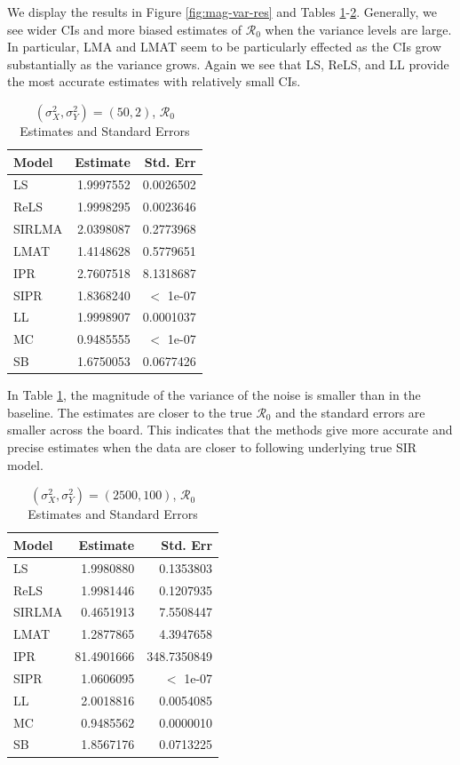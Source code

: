 \documentclass[12pt]{article}
\newcommand{\rr}{\ensuremath{\mathcal{R}_0}}
\begin{document}
We display the results in Figure \ref{fig:mag-var-res} and Tables \ref{tab:mag-var-res1}-\ref{tab:mag-var-res2}.  Generally, we see wider CIs and more biased estimates of $\rr$ when the variance levels are large.  In particular, LMA and LMAT seem to be particularly effected as the CIs grow substantially as the variance grows.  Again we see that LS, ReLS, and LL provide the most accurate estimates with relatively small CIs.

\begin{table}[H]
	

	\centering
	\begin{tabular}[t]{l|r|r}
		\hline
		Model & Estimate & Std. Err\\
		\hline
		LS & 1.9997552 & 0.0026502\\
		\hline
		ReLS & 1.9998295 & 0.0023646\\
		\hline
		SIRLMA & 2.0398087 & 0.2773968\\
		\hline
		LMAT & 1.4148628 & 0.5779651\\
		\hline
		IPR & 2.7607518 & 8.1318687\\
		\hline
		SIPR & 1.8368240 & $<$ 1e-07\\
		\hline
		LL & 1.9998907 & 0.0001037\\
		\hline
		MC & 0.9485555 & $<$ 1e-07\\
		\hline
		SB & 1.6750053 & 0.0677426\\
		\hline
	\end{tabular}
        	\caption{ $(\sigma^2_X, \sigma^2_Y) = (50, 2)$, $\rr$ Estimates and Standard Errors}\label{tab:mag-var-res1}
\end{table}

In Table \ref{tab:mag-var-res1}, the magnitude of the variance of the noise is smaller than in the baseline. The estimates are closer to the true $\rr$ and the standard errors are smaller across the board. This indicates that the methods give more accurate and precise estimates when the data are closer to following underlying true SIR model.


\begin{table}[H]
	

	\centering
	\begin{tabular}[t]{l|r|r}
		\hline
		Model & Estimate & Std. Err\\
		\hline
		LS & 1.9980880 & 0.1353803\\
		\hline
		ReLS & 1.9981446 & 0.1207935\\
		\hline
		SIRLMA & 0.4651913 & 7.5508447\\
		\hline
		LMAT & 1.2877865 & 4.3947658\\
		\hline
		IPR & 81.4901666 & 348.7350849\\
		\hline
		SIPR & 1.0606095 & $<$ 1e-07\\
		\hline
		LL & 2.0018816 & 0.0054085\\
		\hline
		MC & 0.9485562 & 0.0000010\\
		\hline
		SB & 1.8567176 & 0.0713225\\
		\hline
	\end{tabular}
        	\caption{$(\sigma^2_X, \sigma^2_Y) = (2500, 100)$, $\rr$ Estimates and Standard Errors}\label{tab:mag-var-res2}
\end{table}
\end{document}
